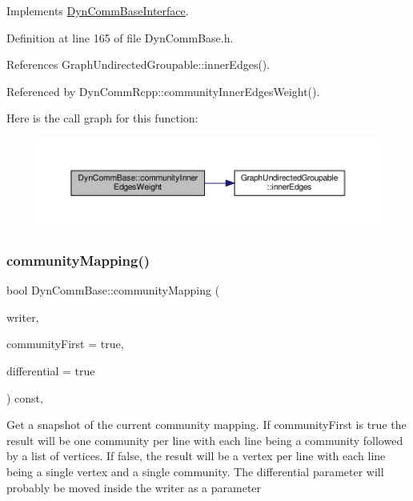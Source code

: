 Implements \hyperlink{classDynCommBaseInterface_a0e68dcfcc55385ce60b000d76ccd2d86}{Dyn\+Comm\+Base\+Interface}.



Definition at line 165 of file Dyn\+Comm\+Base.\+h.



References Graph\+Undirected\+Groupable\+::inner\+Edges().



Referenced by Dyn\+Comm\+Rcpp\+::community\+Inner\+Edges\+Weight().

Here is the call graph for this function\+:
\nopagebreak
\begin{figure}[H]
\begin{center}
\leavevmode
\includegraphics[width=350pt]{classDynCommBase_ada91e7e914eb8be7f8c25f4c0c81156a_cgraph}
\end{center}
\end{figure}
\mbox{\label{classDynCommBase_a75ed5e0546d756a3b327f41e292620b2}} 
\subsubsection{\texorpdfstring{community\+Mapping()}{communityMapping()}}
{\footnotesize\ttfamily bool Dyn\+Comm\+Base\+::community\+Mapping (\begin{DoxyParamCaption}\item[{\hyperlink{classWriterInterface}{Writer\+Interface} $\ast$}]{writer,  }\item[{bool}]{community\+First = {\ttfamily true},  }\item[{bool}]{differential = {\ttfamily true} }\end{DoxyParamCaption}) const\hspace{0.3cm}{\ttfamily [inline]}, {\ttfamily [virtual]}}

Get a snapshot of the current community mapping. If community\+First is true the result will be one community per line with each line being a community followed by a list of vertices. If false, the result will be a vertex per line with each line being a single vertex and a single community. The differential parameter will probably be moved inside the writer as a parameter


